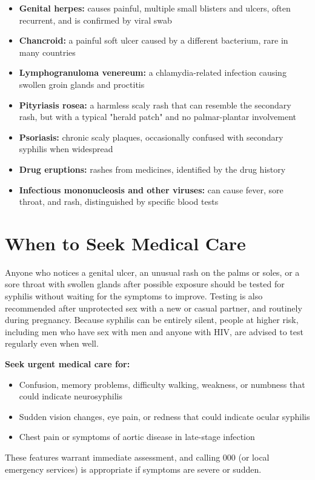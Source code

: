 \begin{itemize}
    \item \textbf{Genital herpes:} causes painful, multiple small blisters and ulcers, often recurrent, and is confirmed by viral swab
    \item \textbf{Chancroid:} a painful soft ulcer caused by a different bacterium, rare in many countries
    \item \textbf{Lymphogranuloma venereum:} a chlamydia-related infection causing swollen groin glands and proctitis
    \item \textbf{Pityriasis rosea:} a harmless scaly rash that can resemble the secondary rash, but with a typical "herald patch" and no palmar-plantar involvement
    \item \textbf{Psoriasis:} chronic scaly plaques, occasionally confused with secondary syphilis when widespread
    \item \textbf{Drug eruptions:} rashes from medicines, identified by the drug history
    \item \textbf{Infectious mononucleosis and other viruses:} can cause fever, sore throat, and rash, distinguished by specific blood tests
\end{itemize}

\section*{When to Seek Medical Care}
Anyone who notices a genital ulcer, an unusual rash on the palms or soles, or a sore throat with swollen glands after possible exposure should be tested for syphilis without waiting for the symptoms to improve. Testing is also recommended after unprotected sex with a new or casual partner, and routinely during pregnancy. Because syphilis can be entirely silent, people at higher risk, including men who have sex with men and anyone with HIV, are advised to test regularly even when well.

\textbf{Seek urgent medical care for:}
\begin{itemize}
    \item Confusion, memory problems, difficulty walking, weakness, or numbness that could indicate neurosyphilis
    \item Sudden vision changes, eye pain, or redness that could indicate ocular syphilis
    \item Chest pain or symptoms of aortic disease in late-stage infection
\end{itemize}
These features warrant immediate assessment, and calling 000 (or local emergency services) is appropriate if symptoms are severe or sudden.

